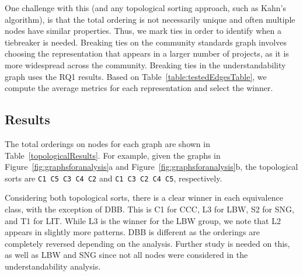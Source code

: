One challenge with this (and any topological sorting approach, such as Kahn's algorithm), is that the total ordering is not necessarily unique and often multiple nodes have similar properties.
Thus, we mark ties in order to identify when a tiebreaker is needed.
Breaking ties on the community standards graph involves choosing the representation that appears in a larger number of projects, as it is more widespread across the community.
Breaking ties in the understandability graph uses the RQ1 results. Based on Table~\ref{table:testedEdgesTable}, we compute the average metrics for each representation and select the winner.

\subsection{Results}
The total orderings on nodes for each graph are shown in Table~\ref{topologicalResults}. For example, given the graphs in Figure~\ref{fig:graphsforanalysis}a and Figure~\ref{fig:graphsforanalysis}b, the topological sorts are {\tt C1 C5 C3 C4 C2} and {\tt C1 C3 C2 C4 C5}, respectively.



Considering both topological sorts, there is a clear winner in each equivalence class, with the exception of DBB.
This is C1 for CCC, L3 for LBW, S2 for SNG, and T1 for LIT.
While L3 is the winner for the LBW group, we note that L2 appears in slightly more patterns.
DBB is different as the orderings are completely reversed depending on the analysis. %
Further study is needed on this, as well as LBW and SNG since not all nodes were considered in the understandability analysis.

